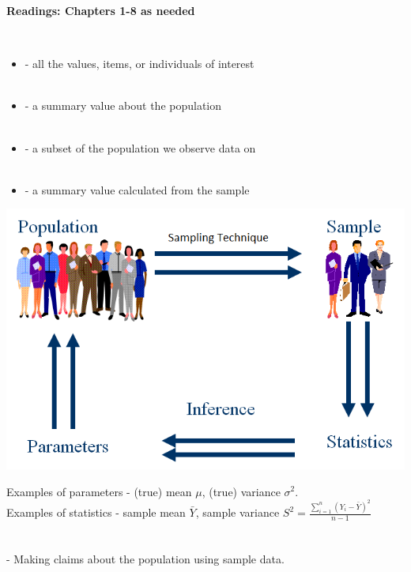 \begin{center}\Large\textbf{Readings: Chapters 1-8 as needed}\\
\normalsize \end{center}
~\hrulefill~\\
\begin{itemize}
\item %
\underbar{~~~~~~~~~~~~~~~~~~~~~~~~~~~~~~~~~~~~~~~} 
- all the values, items, or individuals of interest\\~\\

\item %
\underbar{~~~~~~~~~~~~~~~~~~~~~~~~~~~~~~~~~~~~~~~}  
- a summary value about the population\\~\\

\item %
\underbar{~~~~~~~~~~~~~~~~~~~~~~~~~~~~~~~~~~~~~~~} 
- a subset of the population we observe data on\\~\\

\item %
\underbar{~~~~~~~~~~~~~~~~~~~~~~~~~~~~~~~~~~~~~~~} 
- a summary value calculated from the sample
\end{itemize}

\begin{center}
\includegraphics[scale=0.35]{paradigm}
\end{center}
{Examples of parameters - (true) mean $\mu$, (true) variance $\sigma^2$.\\
Examples of statistics - sample mean $\bar{Y}$, sample variance $S^2=\frac{\sum_{i=1}^{n}(Y_i-\bar{Y})^2}{n-1}$}\\~\\~\\
\underbar{~~~~~~~~~~~~~~~~~~~~~~~~~~~~~}
- Making claims about the population using sample data.

